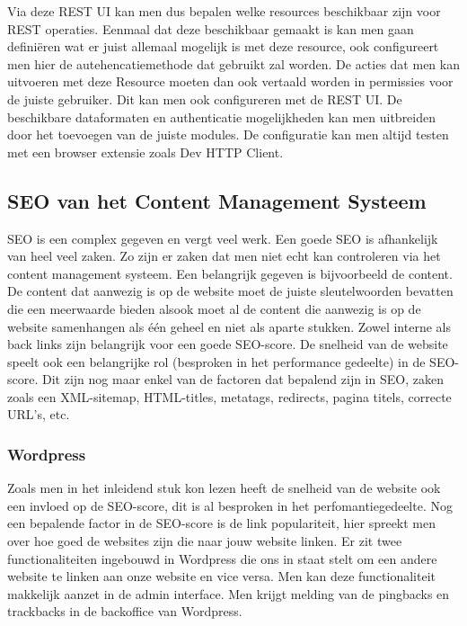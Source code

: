 Via deze REST UI kan men dus bepalen welke resources beschikbaar zijn voor REST operaties. Eenmaal dat deze beschikbaar gemaakt is kan men gaan definiëren wat er juist allemaal mogelijk is met deze resource, ook configureert men hier de autehencatiemethode dat gebruikt zal worden. De acties dat men kan uitvoeren met deze Resource moeten dan ook vertaald worden in permissies voor de juiste gebruiker. Dit kan men ook configureren met de REST UI. De beschikbare dataformaten en authenticatie mogelijkheden kan men uitbreiden door het toevoegen van de juiste modules. De configuratie kan men altijd testen met een browser extensie zoals Dev HTTP Client.

\subsection{SEO van het Content Management Systeem}
SEO is een complex gegeven en vergt veel werk. Een goede SEO is afhankelijk van heel veel zaken. Zo zijn er zaken dat men niet echt kan controleren via het content management systeem. Een belangrijk gegeven is bijvoorbeeld de content. De content dat aanwezig is op de website moet de juiste sleutelwoorden bevatten die een meerwaarde bieden alsook moet al de content die aanwezig is op de website samenhangen als één geheel en niet als aparte stukken. Zowel interne als back links zijn belangrijk voor een goede SEO-score. De snelheid van de website speelt ook een belangrijke rol (besproken in het performance gedeelte) in de SEO-score. Dit zijn nog maar enkel van de factoren dat bepalend zijn in SEO, zaken zoals een XML-sitemap, HTML-titles, metatags, redirects, pagina titels, correcte URL's, etc.

\subsubsection{Wordpress}
Zoals men in het inleidend stuk kon lezen heeft de snelheid van de website ook een invloed op de SEO-score, dit is al besproken in het perfomantiegedeelte. Nog een bepalende factor in de SEO-score is de link populariteit, hier spreekt men over hoe goed de websites zijn die naar jouw website linken. Er zit twee functionaliteiten ingebouwd in Wordpress die ons in staat stelt om een andere website te linken aan onze website en vice versa. Men kan deze functionaliteit makkelijk aanzet in de admin interface. Men krijgt melding van de pingbacks en trackbacks in de backoffice van Wordpress.

